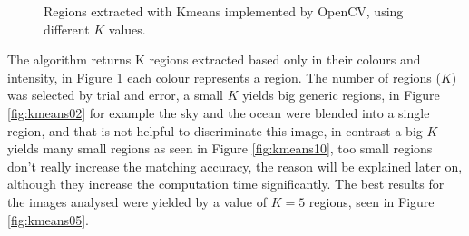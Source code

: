 \documentclass[12pt,a4paper]{article}
\begin{document}
\begin{figure}[!h]
{{			
		}
		\label{fig:kmeans08}
	}
	\quad
	\caption{Regions extracted with Kmeans implemented by OpenCV, using different $K$ values.}
	\label{fig:kmeans}
\end{figure}

	The algorithm returns K regions extracted based only in their colours and intensity, in Figure \ref{fig:kmeans} each colour represents a region. The number of regions ($K$) was selected by trial and error, a small $K$ yields big generic regions, in Figure \ref{fig:kmeans02} for example the sky and the ocean were blended into a single region, and that is not helpful to discriminate this image, in contrast a big $K$ yields many small regions as seen in Figure \ref{fig:kmeans10},  too small regions don't really increase the matching accuracy, the reason will be explained later on, although they increase the computation time significantly. The best results for the images analysed were yielded by a value of $K = 5$ regions, seen in Figure \ref{fig:kmeans05}.
\end{document}
